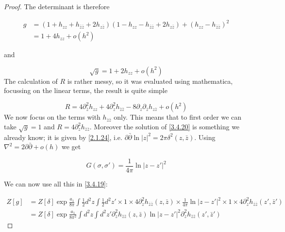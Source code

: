 \begin{tcolorbox}[breakable]
\begin{proof}
		The determinant is therefore
		
		\begin{equation}
			\begin{aligned}
				g &= (1 + h_{zz} + h_{\bar{z}\bar{z}} + 2h_{z\bar{z}})(1 - h_{zz} - h_{\bar{z}\bar{z}} + 2h_{z\bar{z}}) + (h_{zz} - h_{\bar{z}\bar{z}})^2 \\
				&= 1 + 4h_{zz} + o(h^2)
			\end{aligned}
		\end{equation}
		
		and
		
		\begin{equation}
			\sqrt{g} = 1 + 2h_{zz} + o(h^2)
		\end{equation}
		The calculation of \( R \) is rather messy, so it was evaluated using mathematica, focussing on the linear terms, the result is quite simple
		
		\begin{equation}
			R = 4\partial_{\bar z}^2 h_{zz} + 4\partial_z^2 h_{\bar{z}\bar{z}} - 8\partial_z \partial_{\bar{z}} h_{z\bar{z}} + o(h^2)
		\end{equation}
		We now focus on the terms with \( h_{\bar z\bar{z}} \) only. This means that to first order we can take \(\sqrt{g} = 1\) and \( R = 4\partial_z^2 h_{\bar z\bar z} \). Moreover the solution of \eqref{3.4.20} is something we already know; it is given by \eqref{2.1.24}, i.e. \( \partial\bar{\partial} \ln |z|^2 = 2\pi\delta^2(z,\bar{z}) \). Using \( \nabla^2 = 2\partial\bar{\partial} + o(h) \) we get
		
		\begin{equation}
			G(\sigma, \sigma') = \frac{1}{4\pi} \ln |z - z'|^2
		\end{equation}
		
		We can now use all this in \eqref{3.4.19}:
		
		\begin{equation}
			\begin{aligned}
				Z[g] &= Z[\delta] \exp \frac{a_1}{8\pi} \int \frac{1}{2} d^2 z \int \frac{1}{2} d^2 z' \times 1 \times 4\partial_z^2 h_{\bar z\bar{z}}(z,\bar{z}) \times \frac{1}{4\pi} \ln |z - z'|^2 \times 1 \times 4\partial_z^2 h_{\bar{z}\bar{z}}(z',\bar{z}') \\
				&= Z[\delta] \exp \frac{a_1}{8\pi^2} \int d^2 z \int d^2 z' \partial_z^2 h_{\bar z\bar{z}}(z,\bar{z}) \ln |z - z'|^2 \partial_z^2 h_{\bar{z}\bar{z}}(z',\bar{z}')
			\end{aligned}
		\end{equation}
		

\end{proof}
\end{tcolorbox}
